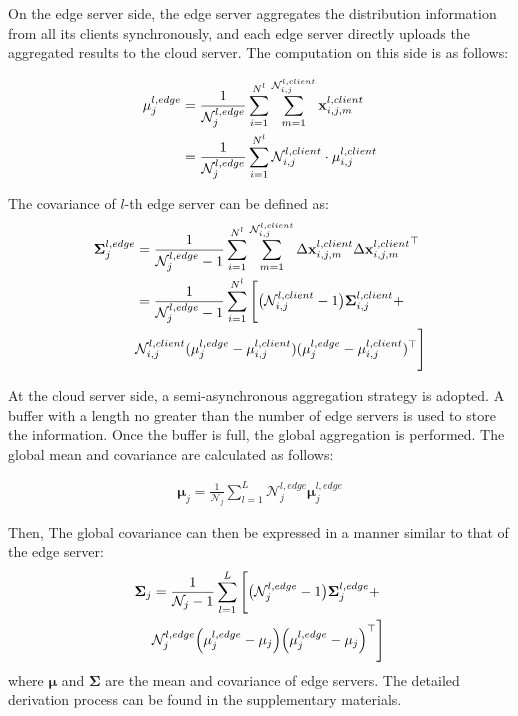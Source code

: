 \documentclass[journal]{IEEEtran}
\begin{document}
On the edge server side, the edge server aggregates the distribution information from all its clients synchronously, and each edge server directly uploads the aggregated results to the cloud server. The computation on this side is as follows:  

\begin{align}
    \label{edge mean}
   \mathbf{\mu}^{l,edge}_{j} &= \frac{1}{\mathcal{N}^{l,edge}_{j}} 
   \sum_{i=1}^{N^l}\sum_{m=1}^{\mathcal{N}^{l,client}_{i,j}} \mathbf{x}^{l,client}_{i,j,m} \notag \\
   &= \frac{1}{\mathcal{N}^{l,edge}_{j}} 
   \sum_{i=1}^{N^l} \mathcal{N}^{l,client}_{i,j} \cdot \mathbf{\mu}^{l,client}_{i,j}
\end{align}

The covariance of \(l\)-th edge server can be defined as:
\begin{align}
    \label{edge covariance}
   \mathbf{\Sigma}^{l,edge}_{j} &= \frac{1}{\mathcal{N}^{l,edge}_{j}-1} \sum_{i=1}^{N^l}
   \sum_{m=1}^{\mathcal{N}^{l,client}_{i,j}} \Delta \mathbf{x}^{l,client}_{i,j,m} \Delta {\mathbf{x}^{l,client}_{i,j,m}}^\top \notag \\
   &= \frac{1}{\mathcal{N}^{l,edge}_{j}-1} \sum_{i=1}^{N^l} \Bigg[
   \big( \mathcal{N}^{l,client}_{i,j}-1\big)\mathbf{\Sigma}^{l,client}_{i,j}+ \notag\\
   & \mathcal{N}^{l,client}_{i,j}(\mathbf{\mu}^{l,edge}_{j}-\mathbf{\mu}^{l,client}_{i,j})(\mathbf{\mu}^{l,edge}_{j}-\mathbf{\mu}^{l,client}_{i,j})^\top\Bigg]
\end{align}

At the cloud server side, a semi-asynchronous aggregation strategy is adopted. A buffer with a length no greater than the number of edge servers is used to store the information. Once the buffer is full, the global aggregation is performed. The global mean and covariance are calculated as follows:  

\begin{align}
  \label{cloud mean}
  \mathbf{\mu}_j = \frac{1}{\mathcal{N}_{j}} \sum_{l=1}^{L} \mathcal{N}^{l,edge}_{j} \mathbf{\mu}^{l,edge}_{j}
  \end{align}
  
  Then, The global covariance can then be expressed in a manner similar to that of the edge server:
\begin{align}
  \label{cloud covariance}
  \mathbf{\Sigma}_j &= \frac{1}{\mathcal{N}_{j} - 1} \sum_{l=1}^{L} \Bigg[
  \big(\mathcal{N}^{l,edge}_{j}-1\big) \mathbf{\Sigma}^{l,edge}_{j} + \notag \\
  &\mathcal{N}^{l,edge}_{j} \Big(\mathbf{\mu}^{l,edge}_{j} - \mathbf{\mu}_j \Big) \Big(\mathbf{\mu}^{l,edge}_{j} - \mathbf{\mu}_j \Big)^\top \Bigg]
\end{align}
where \( \mathbf{\mu}\) and \( \mathbf{\Sigma} \) are the mean and covariance of edge servers. The detailed derivation process can be found in the supplementary materials.
\end{document}
